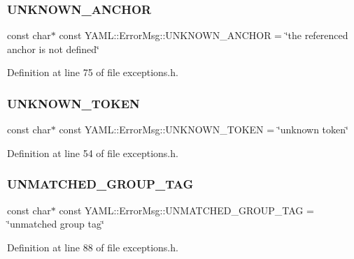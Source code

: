 \subsubsection{\texorpdfstring{UNKNOWN\_ANCHOR}{UNKNOWN\_ANCHOR}}
{\footnotesize\ttfamily const char$\ast$ const Y\+A\+M\+L\+::\+Error\+Msg\+::\+U\+N\+K\+N\+O\+W\+N\+\_\+\+A\+N\+C\+H\+OR = \char`\"{}the referenced anchor is not defined\char`\"{}}



Definition at line 75 of file exceptions.\+h.

\mbox{\label{namespace_y_a_m_l_1_1_error_msg_a47cb8f44a985382ee5ef00a3e798bdd9}} 
\subsubsection{\texorpdfstring{UNKNOWN\_TOKEN}{UNKNOWN\_TOKEN}}
{\footnotesize\ttfamily const char$\ast$ const Y\+A\+M\+L\+::\+Error\+Msg\+::\+U\+N\+K\+N\+O\+W\+N\+\_\+\+T\+O\+K\+EN = \char`\"{}unknown token\char`\"{}}



Definition at line 54 of file exceptions.\+h.

\mbox{\label{namespace_y_a_m_l_1_1_error_msg_aaa69ecc70caa7224644dfb11605e538c}} 
\subsubsection{\texorpdfstring{UNMATCHED\_GROUP\_TAG}{UNMATCHED\_GROUP\_TAG}}
{\footnotesize\ttfamily const char$\ast$ const Y\+A\+M\+L\+::\+Error\+Msg\+::\+U\+N\+M\+A\+T\+C\+H\+E\+D\+\_\+\+G\+R\+O\+U\+P\+\_\+\+T\+AG = \char`\"{}unmatched group tag\char`\"{}}



Definition at line 88 of file exceptions.\+h.

\mbox{\label{namespace_y_a_m_l_1_1_error_msg_af55c5005be860b9b41659055df5c13f1}} 
